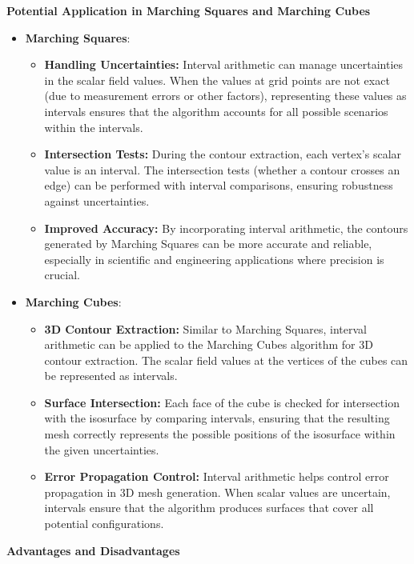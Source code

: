 \documentclass{article}
\begin{document}
\textbf{Potential Application in Marching Squares and Marching Cubes}

\begin{itemize}
    \item \textbf{Marching Squares}:
    \begin{itemize}
        \item \textbf{Handling Uncertainties:} Interval arithmetic can manage uncertainties in the scalar field values. When the values at grid points are not exact (due to measurement errors or other factors), representing these values as intervals ensures that the algorithm accounts for all possible scenarios within the intervals.
        \item \textbf{Intersection Tests:} During the contour extraction, each vertex’s scalar value is an interval. The intersection tests (whether a contour crosses an edge) can be performed with interval comparisons, ensuring robustness against uncertainties.
        \item \textbf{Improved Accuracy:} By incorporating interval arithmetic, the contours generated by Marching Squares can be more accurate and reliable, especially in scientific and engineering applications where precision is crucial.
    \end{itemize}
    \item \textbf{Marching Cubes}:
    \begin{itemize}
        \item \textbf{3D Contour Extraction:} Similar to Marching Squares, interval arithmetic can be applied to the Marching Cubes algorithm for 3D contour extraction. The scalar field values at the vertices of the cubes can be represented as intervals.
        \item \textbf{Surface Intersection:} Each face of the cube is checked for intersection with the isosurface by comparing intervals, ensuring that the resulting mesh correctly represents the possible positions of the isosurface within the given uncertainties.
        \item \textbf{Error Propagation Control:} Interval arithmetic helps control error propagation in 3D mesh generation. When scalar values are uncertain, intervals ensure that the algorithm produces surfaces that cover all potential configurations.
    \end{itemize}
\end{itemize}

\textbf{Advantages and Disadvantages}
\end{document}

